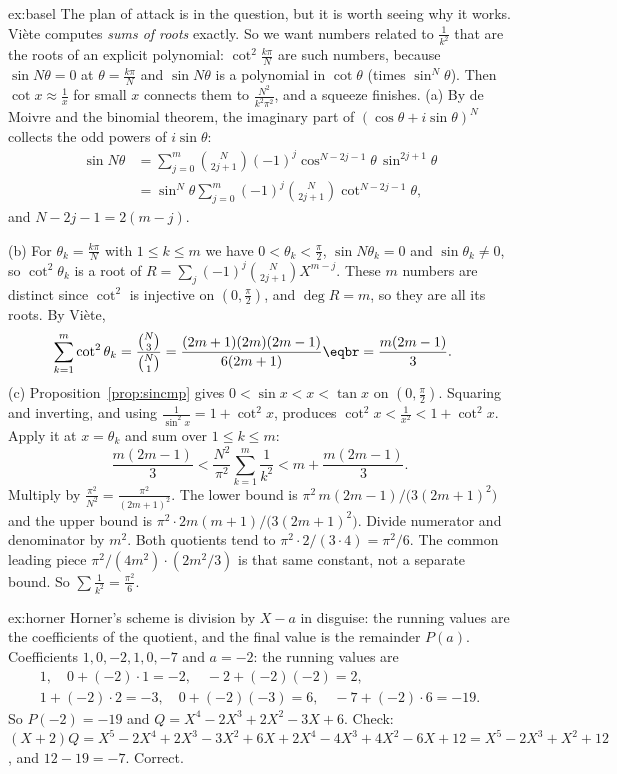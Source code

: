 \begin{solution}{ex:basel}
\idea The plan of attack is in the question, but it is worth seeing why it works. Vi\`ete computes \emph{sums of roots} exactly. So we want numbers related to $\frac1{k^2}$ that are the roots of an explicit polynomial: $\cot^2\frac{k\pi}N$ are such numbers, because $\sin N\theta=0$ at $\theta=\frac{k\pi}N$ and $\sin N\theta$ is a polynomial in $\cot\theta$ (times $\sin^N\theta$). Then $\cot x\approx\frac1x$ for small $x$ connects them to $\frac{N^2}{k^2\pi^2}$, and a squeeze finishes.
\writeup (a) By de Moivre and the binomial theorem, the imaginary part of $(\cos\theta+i\sin\theta)^N$ collects the odd powers of $i\sin\theta$:
\[
\begin{aligned}\sin N\theta&=\sum_{j=0}^m\binom N{2j+1}(-1)^j\cos^{N-2j-1}\theta\,\sin^{2j+1}\theta\\
&=\sin^N\theta\sum_{j=0}^m(-1)^j\binom N{2j+1}\cot^{N-2j-1}\theta,\end{aligned}
\]
and $N-2j-1=2(m-j)$.

(b) For $\theta_k=\frac{k\pi}N$ with $1\le k\le m$ we have $0<\theta_k<\frac\pi2$, $\sin N\theta_k=0$ and $\sin\theta_k\ne0$, so $\cot^2\theta_k$ is a root of
$R=\sum_j(-1)^j\binom N{2j+1}X^{m-j}$. These $m$ numbers are distinct since $\cot^2$ is injective on $\left(0,\frac\pi2\right)$, and $\deg R=m$, so they are all its roots.
By Vi\`ete,
\[
\begin{aligned}\sum_{k=1}^m\cot^2\theta_k&=\frac{\binom N3}{\binom N1}=\frac{(2m+1)(2m)(2m-1)}{6(2m+1)}\eqbr=\frac{m(2m-1)}3.\end{aligned}
\]
(c) Proposition~\ref{prop:sincmp} gives $0<\sin x<x<\tan x$ on $\left(0,\frac\pi2\right)$. Squaring and inverting, and using $\frac1{\sin^2x}=1+\cot^2x$, produces $\cot^2x<\frac1{x^2}<1+\cot^2x$.
Apply it at $x=\theta_k$ and sum over $1\le k\le m$:
\[
\frac{m(2m-1)}3<\frac{N^2}{\pi^2}\sum_{k=1}^m\frac1{k^2}<m+\frac{m(2m-1)}3.
\]
Multiply by $\frac{\pi^2}{N^2}=\frac{\pi^2}{(2m+1)^2}$. The lower bound is $\pi^2\,m(2m-1)/\bigl(3(2m+1)^2\bigr)$ and the upper bound is $\pi^2\cdot 2m(m+1)/\bigl(3(2m+1)^2\bigr)$. Divide numerator and denominator by $m^2$. Both quotients tend to $\pi^2\cdot 2/(3\cdot 4)=\pi^2/6$. The common leading piece $\pi^2/(4m^2)\cdot(2m^2/3)$ is that same constant, not a separate bound. So $\sum\frac1{k^2}=\frac{\pi^2}6$.
\end{solution}

\begin{solution}{ex:horner}
\idea Horner's scheme is division by $X-a$ in disguise: the running values are the coefficients of the quotient, and the final value is the remainder $P(a)$.
\writeup Coefficients $1,0,-2,1,0,-7$ and $a=-2$: the running values are
\[
\begin{gathered}1,\quad 0+(-2)\cdot1=-2,\quad -2+(-2)(-2)=2,\\ 1+(-2)\cdot2=-3,\quad 0+(-2)(-3)=6,\quad -7+(-2)\cdot6=-19.\end{gathered}
\]
So $P(-2)=-19$ and $Q=X^4-2X^3+2X^2-3X+6$. Check: $(X+2)Q=X^5-2X^4+2X^3-3X^2+6X+2X^4-4X^3+4X^2-6X+12=X^5-2X^3+X^2+12$, and $12-19=-7$. Correct.
\end{solution}

